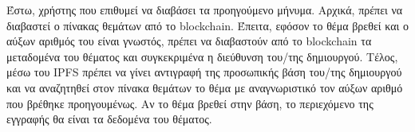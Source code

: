 Έστω, χρήστης που επιθυμεί να διαβάσει τα προηγούμενο μήνυμα. Αρχικά, πρέπει να διαβαστεί ο πίνακας θεμάτων από το blockchain. Έπειτα, εφόσον το θέμα βρεθεί και ο αύξων αριθμός του είναι γνωστός, πρέπει να διαβαστούν από το blockchain τα μεταδομένα του θέματος και συγκεκριμένα η διεύθυνση του/της δημιουργού. Τέλος, μέσω του IPFS πρέπει να γίνει αντιγραφή της προσωπικής βάση του/της δημιουργού και να αναζητηθεί στον πίνακα θεμάτων το θέμα με αναγνωριστικό τον αύξων αριθμό που βρέθηκε προηγουμένως. Αν το θέμα βρεθεί στην βάση, το περιεχόμενο της εγγραφής θα είναι τα δεδομένα του θέματος.
